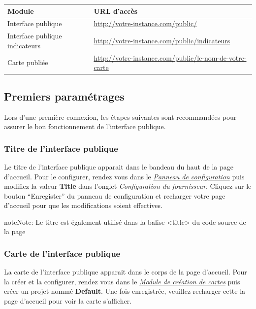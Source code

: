 \documentclass[letterpaper,10pt,french]{sphinxmanual}
\begin{document}
\begin{tabulary}{\linewidth}{|L|L|}
\hline

\textbf{Module}
 & 
\textbf{URL d'accès}
\\
\hline
Interface publique
 & 
\href{http://votre-instance.com/public/}{http://votre-instance.com/public/}
\\
\hline
Interface publique indicateurs
 & 
\href{http://votre-instance.com/public/indicateurs}{http://votre-instance.com/public/indicateurs}
\\
\hline
Carte publiée
 & 
\href{http://votre-instance.com/public/le-nom-de-votre-carte}{http://votre-instance.com/public/le-nom-de-votre-carte}
\\
\hline\end{tabulary}



\subsection{Premiers paramétrages}
\label{introduction/usemapmint:premiers-parametrages}
Lors d'une première connexion, les étapes suivantes sont recommandées pour  assurer le bon fonctionnement de l'interface publique.


\subsubsection{Titre de l'interface publique}
\label{introduction/usemapmint:titre-de-l-interface-publique}
Le titre de l'interface publique apparait dans le bandeau du haut de la page d'accueil. Pour le configurer, rendez vous dans le {\hyperref[dashboard/configuration::doc]{\emph{\emph{Panneau de configuration}}}} puis modifiez la valeur \textbf{Title} dans l'onglet \emph{Configuration du fournisseur}. Cliquez sur le bouton ``Enregister'' du panneau de configuration et recharger votre page d'accueil pour que les modifications soient effectives.

\begin{notice}{note}{Note:}
Le titre est également utilisé dans la balise \textless{}title\textgreater{} du code source de la page
\end{notice}


\subsubsection{Carte de l'interface publique}
\label{introduction/usemapmint:carte-de-l-interface-publique}
La carte de l'interface publique apparait dans le corps de la page d'accueil. Pour la créer et la configurer, rendez vous dans le {\hyperref[maps/index::doc]{\emph{\emph{Module de création de cartes}}}} puis créer un projet nommé \textbf{Default}. Une fois enregistrée, veuillez recharger cette la page d'accueil pour voir la carte s'afficher.
\end{document}
